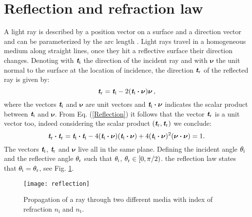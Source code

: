 \section{Reflection and refraction law}\label{sec:reflection}
A light ray is described by a position vector  on a surface and a direction vector  and can be parameterized by the arc length .
Light rays travel in a homogeneous medium along straight lines, once they hit a reflective surface their direction changes.
 Denoting with $\textit{\textbf{t}}_\textrm{i}$ the direction of the incident ray and with $\boldsymbol{\nu}$ the unit normal to the surface at the location of incidence, the direction $\textit{\textbf{t}}_\textrm{r}$ of the reflected ray is given by:
 \begin{equation}\label{Reflection}
  \textit{\textbf{t}}_\textrm{r} = \textit{\textbf{t}}_\textrm{i}-2 (\textit{\textbf{t}}_\textrm{i}\boldsymbol{\cdot}\boldsymbol{\nu})\boldsymbol{\nu}\,,
\end{equation}
where the vectors $\textit{\textbf{t}}_\textrm{i}$ and $\boldsymbol{\nu}$ are unit vectors and $\textit{\textbf{t}}_\textrm{i}\boldsymbol{\cdot}\boldsymbol{\nu}$ indicates the scalar product between 
$\textit{\textbf{t}}_\textrm{i}$ and $\boldsymbol{\nu}$. 
From Eq. (\ref{Reflection}) it follows that the vector  $\textit{\textbf{t}}_\textrm{r}$ is a unit vector too, indeed considering the scalar product $(\textit{\textbf{t}}_\textrm{r},\textit{\textbf{t}}_\textrm{r})$ we conclude:
\begin{equation}\label{unit_vector}
\textit{\textbf{t}}_\textrm{r}\boldsymbol{\cdot}\textit{\textbf{t}}_\textrm{r} = \textit{\textbf{t}}_\textrm{i}\boldsymbol{\cdot}\textit{\textbf{t}}_\textrm{i} 
- 4(\textit{\textbf{t}}_\textrm{i}\boldsymbol{\cdot}\boldsymbol{\nu})(\textit{\textbf{t}}_\textrm{i}\boldsymbol{\cdot}\boldsymbol{\nu})+
4(\textit{\textbf{t}}_\textrm{i}\boldsymbol{\cdot}\boldsymbol{\nu})^2(\boldsymbol{\nu}\boldsymbol{\cdot}\boldsymbol{\nu})=1 .
\end{equation} 
The vectors $\textit{\textbf{t}}_\textrm{i}$, $\textit{\textbf{t}}_\textrm{r}$ and $\boldsymbol{\nu}$ live all in the same plane.
Defining the incident angle $\theta_\textrm{i}$ and the reflective angle $\theta_\textrm{r}$ such that $\theta_\textrm{i}$, $\theta_\textrm{r} \in[0, \pi/2)$.
the reflection law states that $\theta_\textrm{i}=\theta_\textrm{r}$, see Fig. \ref{fig:Snell}.
\begin{figure}[h]
 \label{fig:Snell}
     \begin{center}
     \texttt{[image: reflection]}
     \end{center}
     \caption{Propagation of a ray through two different media with index of refraction $n_\textrm{i}$ and $n_\textrm{t}$.}%
\label{fig:Snell}
 \end{figure}
